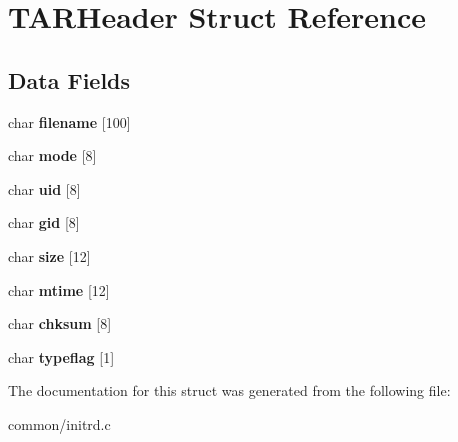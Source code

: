 \hypertarget{structTARHeader}{}\section{T\+A\+R\+Header Struct Reference}
\label{structTARHeader}
\subsection*{Data Fields}
\begin{DoxyCompactItemize}
\item 
char {\bfseries filename} \mbox{[}100\mbox{]}\hypertarget{structTARHeader_a3f7f8fd1b90caf3f8c8bd8940301c4e6}{}\label{structTARHeader_a3f7f8fd1b90caf3f8c8bd8940301c4e6}

\item 
char {\bfseries mode} \mbox{[}8\mbox{]}\hypertarget{structTARHeader_a1fe13efb037d7a4f22311bbf824a5c40}{}\label{structTARHeader_a1fe13efb037d7a4f22311bbf824a5c40}

\item 
char {\bfseries uid} \mbox{[}8\mbox{]}\hypertarget{structTARHeader_a226fe8eb193cf8fc6d10397c76d5eca5}{}\label{structTARHeader_a226fe8eb193cf8fc6d10397c76d5eca5}

\item 
char {\bfseries gid} \mbox{[}8\mbox{]}\hypertarget{structTARHeader_abb8a47545f0ef11639a46b1a391d6fc5}{}\label{structTARHeader_abb8a47545f0ef11639a46b1a391d6fc5}

\item 
char {\bfseries size} \mbox{[}12\mbox{]}\hypertarget{structTARHeader_a96b01aaaecbe7d2b7a58bf2332c62336}{}\label{structTARHeader_a96b01aaaecbe7d2b7a58bf2332c62336}

\item 
char {\bfseries mtime} \mbox{[}12\mbox{]}\hypertarget{structTARHeader_acd57448f5fe43776ce1fc2f9fbfe7fb8}{}\label{structTARHeader_acd57448f5fe43776ce1fc2f9fbfe7fb8}

\item 
char {\bfseries chksum} \mbox{[}8\mbox{]}\hypertarget{structTARHeader_adc115020be01e5cf2bca1fc211fe0fe3}{}\label{structTARHeader_adc115020be01e5cf2bca1fc211fe0fe3}

\item 
char {\bfseries typeflag} \mbox{[}1\mbox{]}\hypertarget{structTARHeader_aa018da87f901a02f9994e397d26d0559}{}\label{structTARHeader_aa018da87f901a02f9994e397d26d0559}

\end{DoxyCompactItemize}


The documentation for this struct was generated from the following file\+:\begin{DoxyCompactItemize}
\item 
common/initrd.\+c\end{DoxyCompactItemize}
